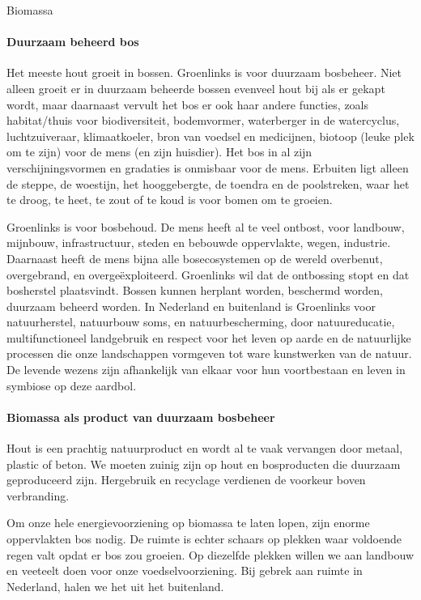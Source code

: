 \begin{voorstel}{Biomassa}
\begin{overwegingen}
\paragraph{Duurzaam beheerd bos}
Het meeste hout groeit in bossen. Groenlinks is voor duurzaam bosbeheer. Niet alleen groeit er in duurzaam beheerde bossen evenveel hout bij als er gekapt wordt, maar daarnaast vervult het bos er ook haar andere functies, zoals habitat/thuis voor biodiversiteit, bodemvormer, waterberger in de watercyclus, luchtzuiveraar, klimaatkoeler, bron van voedsel en medicijnen, biotoop (leuke plek om te zijn) voor de mens (en zijn huisdier). Het bos in al zijn verschijningsvormen en gradaties is onmisbaar voor de mens. Erbuiten ligt alleen de steppe, de woestijn, het hooggebergte, de toendra en de poolstreken, waar het te droog, te heet, te zout of te koud is voor bomen om te groeien.

Groenlinks is voor bosbehoud. De mens heeft al te veel ontbost, voor landbouw, mijnbouw, infrastructuur, steden en bebouwde oppervlakte, wegen, industrie. Daarnaast heeft de mens bijna alle bosecosystemen op de wereld overbenut, overgebrand, en overgeëxploiteerd. Groenlinks wil dat de ontbossing stopt en dat bosherstel plaatsvindt. Bossen kunnen herplant worden, beschermd worden, duurzaam beheerd worden. In Nederland en buitenland is Groenlinks voor natuurherstel, natuurbouw soms, en natuurbescherming, door natuureducatie, multifunctioneel landgebruik en respect voor het leven op aarde en de natuurlijke processen die onze landschappen vormgeven tot ware kunstwerken van de natuur. De levende wezens zijn afhankelijk van elkaar voor hun voortbestaan en leven in symbiose op deze aardbol.

\paragraph{Biomassa als product van duurzaam bosbeheer}
Hout is een prachtig natuurproduct en wordt al te vaak vervangen door metaal, plastic of beton. We moeten zuinig zijn op hout en bosproducten die duurzaam geproduceerd zijn. Hergebruik en recyclage verdienen de voorkeur boven verbranding.

Om onze hele energievoorziening op biomassa te laten lopen, zijn enorme oppervlakten bos nodig. De ruimte is echter schaars op plekken waar voldoende regen valt opdat er bos zou groeien. Op diezelfde plekken willen we aan landbouw en veeteelt doen voor onze voedselvoorziening. Bij gebrek aan ruimte in Nederland, halen we het uit het buitenland.


\end{overwegingen}
\end{voorstel}
